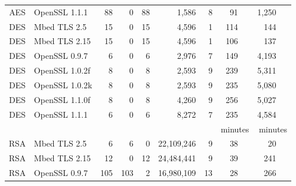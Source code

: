 \begin{table}
\begin{tabular}{clrrrrrrr}
        AES                & OpenSSL 1.1.1            & 88                    & 0                   & 88                   & 1,586       & 8    & 91 ~~      & 1,250 ~~        \\
        DES                & Mbed TLS 2.5             & 15                    & 0                   & 15                   & 4,596       & 1    & 114 ~~     & 144 ~~          \\
        DES                & Mbed TLS 2.15            & 15                    & 0                   & 15                   & 4,596       & 1    & 106 ~~     & 137 ~~          \\
        DES                & OpenSSL 0.9.7            & 6                     & 0                   & 6                    & 2,976       & 7    & 149 ~~     & 4,193       ~~  \\
        DES                & OpenSSL 1.0.2f           & 8                     & 0                   & 8                    & 2,593       & 9    & 239 ~~     & 5,311       ~~  \\
        DES                & OpenSSL 1.0.2k           & 8                     & 0                   & 8                    & 2,593       & 9    & 235 ~~     & 5,080        ~~ \\
        DES                & OpenSSL 1.1.0f           & 8                     & 0                   & 8                    & 4,260       & 9    & 256 ~~     & 5,027        ~~ \\
        DES                & OpenSSL 1.1.1            & 6                     & 0                   & 6                    & 8,272       & 7    & 235 ~~     & 4,584       ~~  \\
                           &                          &                       &                     &                      &             &      & minutes    & minutes         \\\cline{8-9}
        RSA                & Mbed TLS 2.5             & 6                     & 6                   & 0                    & 22,109,246  & 9    & 38 ~~      & 20  ~~          \\
        RSA                & Mbed TLS 2.15            & 12                    & 0                   & 12                   & 24,484,441  & 9    & 39 ~~      & 241  ~~         \\
        RSA                & OpenSSL 0.9.7            & 105                   & 103                 & 2                    & 16,980,109  & 13   & 28 ~~      & 266 ~~          \\

\end{tabular}
\end{table}
